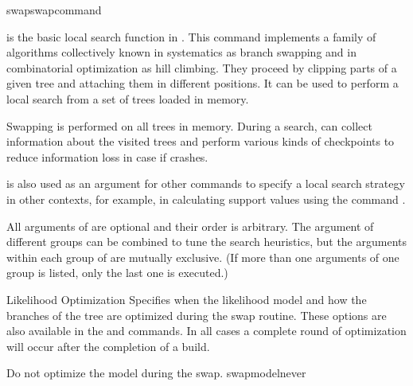 \begin{command}{swap}{swapcommand}


	\begin{poydescription} 
         is the basic local search function in \poy. This
        command implements a family of algorithms collectively known in systematics as
        branch swapping and in combinatorial optimization as hill climbing. They proceed by clipping parts of a given tree and
        attaching them in different positions.  It can be
        used to perform a local search from a set of trees loaded in memory.

        Swapping is performed on all trees in memory. During a search,
         can collect information about the
        visited trees and perform various kinds of checkpoints to reduce
        information loss in case if \poy crashes.

         is also used as an argument for other
        commands to specify a local search strategy in other contexts, for example,
        in calculating support values using the command
        .
        
        All arguments of  are optional and their order
        is arbitrary. The argument of different groups can be combined to tune the search heuristics, but the arguments within each group of are mutually exclusive. (If more than one arguments of one group is listed, only the last one is executed.)
    \end{poydescription}

	\begin{arguments}

        \begin{argumentgroup}{Likelihood Optimization}
            {Specifies when the likelihood model and how the branches of the
            tree are optimized during the swap routine. These options are also
            available in the  and 
            commands. In all cases a complete round of optimization will occur
            after the completion of a build.}

                {
                \begin{description}

                        {Do not optimize the model during the swap.}
                        {swapmodelnever}


\end{description}}
\end{argumentgroup}
\end{arguments}
\end{command}
